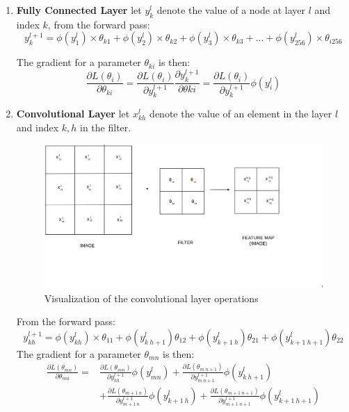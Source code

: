        \begin{enumerate}
            \item \textbf{Fully Connected Layer} let $y^l_k$ denote the value of a node at layer $l$ and index $k$, from the forward pass:
            \begin{equation*}
                 y^{l+1}_k = \phi (y^l_1)\times \theta_{k1}+\phi (y^l_2) \times \theta_{k2}+\phi (y^l_3)\times \theta_{k3}+...+\phi (y^l_{256})\times \theta_{i256}
            \end{equation*}
            
            The gradient for a parameter $\theta_{ki}$ is then:
            \begin{equation*}
                \frac{\partial L(\theta_i)}{\partial \theta_{ki}}=\frac{\partial L(\theta_i)}{\partial y^{l+1}_k}\frac{\partial y^{l+1}_k}{\partial \theta{ki}}=\frac{\partial L(\theta_i)}{\partial y^{l+1}_k}\phi(y^l_i)
            \end{equation*}
           \item \textbf{Convolutional Layer} let $x^l_{kh}$ denote the value of an element in the layer $l$ and index $k,h$ in the filter.  
           \begin{figure}[H]
               \centering
               \includegraphics[scale=0.2]{images/convlayer2.png}
               \caption{Visualization of the convolutional layer operations}
               \label{fig:convlayer2}
           \end{figure}From the forward pass:
           \begin{equation*}
               y^{l+1}_{kh} = \phi (y^l_{kh})\times \theta_{11}+\phi (y^l_{k \ h+1}) \theta_{12}+\phi (y^l_{k+1 \ h}) \theta_{21} + \phi (y^l_{k+1 \ h+1}) \theta_{22}
           \end{equation*}
            The gradient for a parameter $\theta_{mn}$ is then:
           \begin{align*}
                \frac{\partial L(\theta_{mn})}{\partial \theta_{mn}}=& \frac{\partial L(\theta_{mn})}{\partial y^{l+1}_{kh}}\phi(y^l_{mn})+\frac{\partial L(\theta_{m \ n+1})}{\partial y^{l+1}_{m\ n+1}}\phi(y^l_{k \ h+1}) \\
                & +\frac{\partial L(\theta_{m+1 \ n})}{\partial y^{l+1}_{m+1\ n}}\phi(y^l_{k+1 \ h})+\frac{\partial L(\theta_{m +1\ n+1})}{\partial y^{l+1}_{m+1\ n+1}}\phi(y^l_{k+1 \ h+1})
            \end{align*}
        \end{enumerate}
